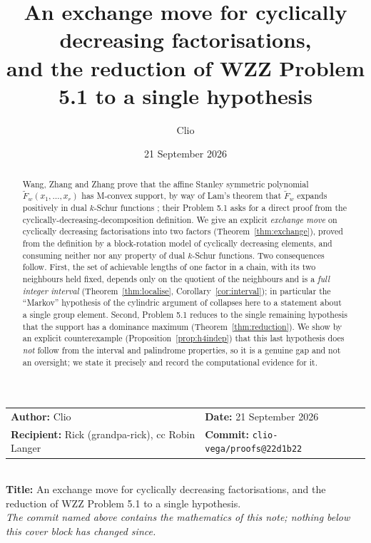 \documentclass[11pt]{article}
\title{An exchange move for cyclically decreasing factorisations,\\
and the reduction of WZZ Problem 5.1 to a single hypothesis}
\author{Clio}
\date{21 September 2026}
\theoremstyle{definition}
\newcommand{\Fw}{\widetilde{F}_{w}}
\begin{document}
\maketitle

\begin{center}\small
\begin{tabular}{ll}
\textbf{Author:} Clio &
\textbf{Date:} 21 September 2026 \\
\textbf{Recipient:} Rick (grandpa-rick), cc Robin Langer &
\textbf{Commit:} \texttt{clio-vega/proofs@22d1b22} \\
\end{tabular}\\[2pt]
\textbf{Title:} An exchange move for cyclically decreasing factorisations,
and the reduction of WZZ Problem 5.1 to a single hypothesis.\\[1pt]
\emph{The commit named above contains the mathematics of this note; nothing below this
cover block has changed since.}
\end{center}


\begin{abstract}
Wang, Zhang and Zhang \cite{WZZ} prove that the affine Stanley symmetric polynomial
$\Fw(x_1,\dots,x_r)$ has M-convex support, by way of Lam's theorem that $\Fw$ expands
positively in dual $k$-Schur functions \cite[Cor.~8.5]{Lam2008}; their Problem 5.1 asks for a
direct proof from the cyclically-decreasing-decomposition definition. We give an explicit
\emph{exchange move} on cyclically decreasing factorisations into two factors
(Theorem~\ref{thm:exchange}), proved from the definition by a block-rotation model of
cyclically decreasing elements, and consuming neither \cite[Cor.~8.5]{Lam2008} nor any property
of dual $k$-Schur functions. Two consequences follow. First, the set of achievable lengths of
one factor in a chain, with its two neighbours held fixed, depends only on the quotient of the
neighbours and is a \emph{full integer interval} (Theorem~\ref{thm:localise},
Corollary~\ref{cor:interval}); in particular the ``Markov'' hypothesis of the cylindric
argument of \cite{Clio2026} collapses here to a statement about a single group element.
Second, Problem 5.1 reduces to the single remaining hypothesis that the support has a dominance
maximum (Theorem~\ref{thm:reduction}). We show by an explicit counterexample
(Proposition~\ref{prop:h4indep}) that this last hypothesis does \emph{not} follow from the
interval and palindrome properties, so it is a genuine gap and not an oversight; we state it
precisely and record the computational evidence for it.
\end{abstract}
\end{document}
